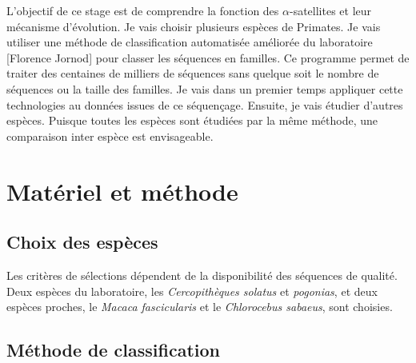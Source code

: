 \documentclass[12pt,a4paper]{article}
\begin{document}
L'objectif de ce stage est de comprendre la fonction des $\alpha$-satellites et leur mécanisme d'évolution. Je vais choisir plusieurs espèces de Primates. Je vais utiliser une méthode de classification automatisée améliorée du laboratoire [Florence Jornod] pour classer les séquences en familles.  Ce programme permet de traiter des centaines de milliers de séquences sans quelque soit le nombre de séquences ou la taille des familles. Je vais dans un premier temps appliquer cette technologies au données issues de ce séquençage. Ensuite, je vais étudier d'autres espèces. Puisque toutes les espèces sont étudiées par la  même méthode, une comparaison inter espèce est envisageable. 

\section{Matériel et méthode}
\subsection{Choix des espèces}
Les critères de sélections dépendent de la disponibilité des séquences de qualité. Deux espèces du laboratoire, les \textit{Cercopithèques solatus} et \textit{pogonias}, et deux espèces proches, le \textit{Macaca fascicularis} et le \textit{Chlorocebus sabaeus}, sont choisies.  

 
 
\subsection{Méthode de classification}
\end{document}
